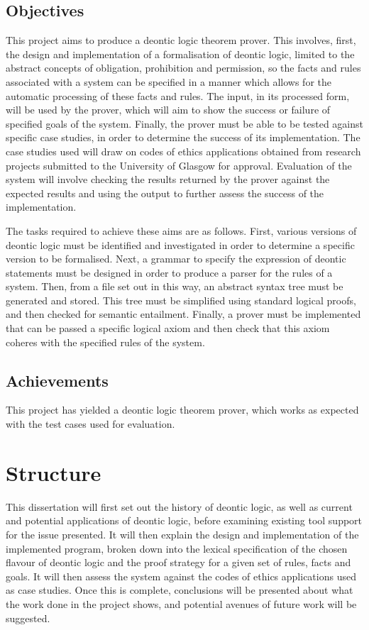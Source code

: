 \documentclass{l4proj}
\begin{document}
\subsection{Objectives}
This project aims to produce a deontic logic theorem prover. This involves, first, the design and implementation of a formalisation of deontic logic, limited to the abstract concepts of obligation, prohibition and permission, so the facts and rules associated with a system can be specified in a manner which allows for the automatic processing of these facts and rules. The input, in its processed form, will be used by the prover, which will aim to show the success or failure of specified goals of the system. Finally, the prover must be able to be tested against specific case studies, in order to determine the success of its implementation. The case studies used will draw on codes of ethics applications obtained from research projects submitted to the University of Glasgow for approval. Evaluation of the system will involve checking the results returned by the prover against the expected results and using the output to further assess the success of the implementation. 

The tasks required to achieve these aims are as follows. First, various versions of deontic logic must be identified and investigated in order to determine a specific version to be formalised. Next, a grammar to specify the expression of deontic statements must be designed in order to produce a parser for the rules of a system. Then, from a file set out in this way, an abstract syntax tree must be generated and stored. This tree must be simplified using standard logical proofs, and then checked for semantic entailment. Finally, a prover must be implemented that can be passed a specific logical axiom and then check that this axiom coheres with the specified rules of the system.

\subsection{Achievements}
This project has yielded a deontic logic theorem prover, which works as expected with the test cases used for evaluation. 

\section{Structure}
This dissertation will first set out the history of deontic logic, as well as current and potential applications of deontic logic, before examining existing tool support for the issue presented. It will then explain the design and implementation of the implemented program, broken down into the lexical specification of the chosen flavour of deontic logic and the proof strategy for a given set of rules, facts and goals. It will then assess the system against the codes of ethics applications used as case studies. Once this is complete, conclusions will be presented about what the work done in the project shows, and potential avenues of future work will be suggested. 
\end{document}
